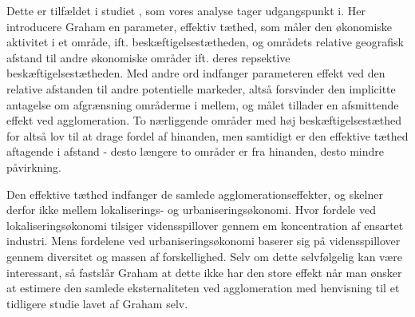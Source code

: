 \documentclass[a4paper, 12pt, titlepage]{article}
\begin{document}
Dette er tilfældet i studiet \cite{graham2007agglomeration}, som vores analyse tager udgangspunkt i. Her introducere Graham en parameter, effektiv tæthed, som måler den økonomiske aktivitet i et område, ift. beskæftigelsestætheden, og områdets relative geografisk afstand til andre økonomiske områder ift. deres repsektive beskæftigelsestætheden. Med andre ord indfanger parameteren effekt ved den relative afstanden til andre potentielle markeder, altså forsvinder den implicitte antagelse om afgrænsning områderme i mellem, og målet tillader en afsmittende effekt ved agglomeration. To nærliggende områder med høj beskæftigelsestæthed for altså lov til at drage fordel af hinanden, men samtidigt er den effektive tæthed aftagende i afstand - desto længere to områder er fra hinanden, desto mindre påvirkning. 

Den effektive tæthed indfanger de samlede agglomerationseffekter, og skelner derfor ikke mellem lokaliserings- og urbaniseringsøkonomi. Hvor fordele ved lokaliseringsøkonomi tilsiger vidensspillover gennem em koncentration af ensartet industri. Mens fordelene ved urbaniseringsøkonomi baserer sig på vidensspillover gennem diversitet og massen af forskellighed. Selv om dette selvfølgelig kan være interessant, så fastslår Graham at dette ikke har den store effekt når man ønsker at estimere den samlede eksternaliteten ved agglomeration med henvisning til et tidligere studie lavet af Graham selv.
\end{document}
